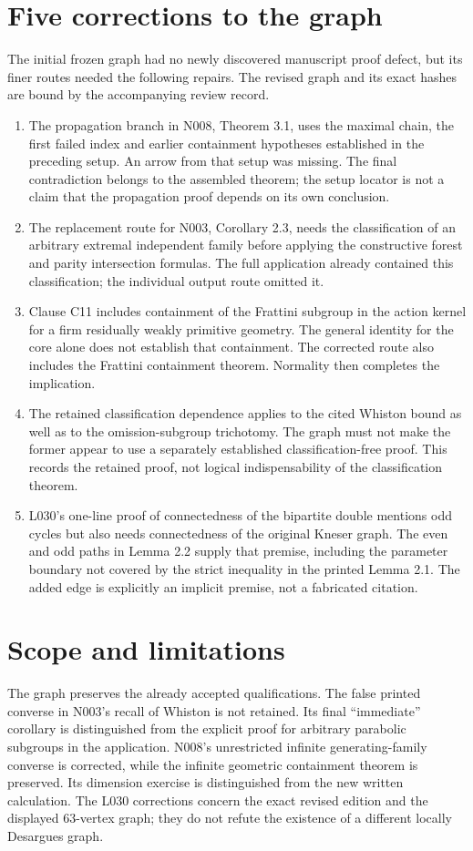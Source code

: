 \documentclass[11pt,a4paper]{article}
\begin{document}
\section{Five corrections to the graph}
The initial frozen graph had no newly discovered manuscript proof defect,
but its finer routes needed the following repairs. The revised graph and
its exact hashes are bound by the accompanying review record.
\begin{enumerate}
\item The propagation branch in N008, Theorem 3.1, uses the maximal chain,
the first failed index and earlier containment hypotheses established in
the preceding setup. An arrow from that setup was missing. The final
contradiction belongs to the assembled theorem; the setup locator is not a
claim that the propagation proof depends on its own conclusion.
\item The replacement route for N003, Corollary 2.3, needs the classification
of an arbitrary extremal independent family before applying the constructive
forest and parity intersection formulas. The full application already
contained this classification; the individual output route omitted it.
\item Clause C11 includes containment of the Frattini subgroup in the action
kernel for a firm residually weakly primitive geometry. The general identity
for the core alone does not establish that containment. The corrected route
also includes the Frattini containment theorem. Normality then completes
the implication.
\item The retained classification dependence applies to the cited Whiston
bound as well as to the omission-subgroup trichotomy. The graph must not
make the former appear to use a separately established classification-free
proof. This records the retained proof, not logical indispensability of the
classification theorem.
\item L030's one-line proof of connectedness of the bipartite double mentions
odd cycles but also needs connectedness of the original Kneser graph. The
even and odd paths in Lemma 2.2 supply that premise, including the parameter
boundary not covered by the strict inequality in the printed Lemma 2.1.
The added edge is explicitly an implicit premise, not a fabricated citation.
\end{enumerate}

\section{Scope and limitations}
The graph preserves the already accepted qualifications. The false printed
converse in N003's recall of Whiston is not retained. Its final ``immediate''
corollary is distinguished from the explicit proof for arbitrary parabolic
subgroups in the application. N008's unrestricted infinite generating-family
converse is corrected, while the infinite geometric containment theorem is
preserved. Its dimension exercise is distinguished from the new written
calculation. The L030 corrections concern the exact revised edition and the
displayed 63-vertex graph; they do not refute the existence of a different
locally Desargues graph.
\end{document}
